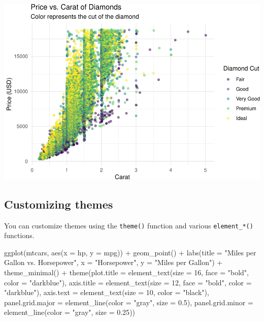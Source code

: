 \documentclass[
]{book}
\newenvironment{Shaded}{\begin{snugshade}}{\end{snugshade}}
\newcommand{\AttributeTok}[1]{\textcolor[rgb]{0.77,0.63,0.00}{#1}}
\newcommand{\DecValTok}[1]{\textcolor[rgb]{0.00,0.00,0.81}{#1}}
\newcommand{\FloatTok}[1]{\textcolor[rgb]{0.00,0.00,0.81}{#1}}
\newcommand{\FunctionTok}[1]{\textcolor[rgb]{0.00,0.00,0.00}{#1}}
\newcommand{\NormalTok}[1]{#1}
\newcommand{\SpecialCharTok}[1]{\textcolor[rgb]{0.00,0.00,0.00}{#1}}
\newcommand{\StringTok}[1]{\textcolor[rgb]{0.31,0.60,0.02}{#1}}
\begin{document}
\includegraphics[width=1\linewidth]{graphformatting_files/figure-latex/unnamed-chunk-3-1}

\hypertarget{customizing-themes}{%
\subsection{Customizing themes}\label{customizing-themes}}

You can customize themes using the \texttt{theme()} function and various \texttt{element\_*()} functions.

\begin{Shaded}
\begin{Highlighting}[]
\FunctionTok{ggplot}\NormalTok{(mtcars, }\FunctionTok{aes}\NormalTok{(}\AttributeTok{x =}\NormalTok{ hp, }\AttributeTok{y =}\NormalTok{ mpg)) }\SpecialCharTok{+}
  \FunctionTok{geom\_point}\NormalTok{() }\SpecialCharTok{+}
  \FunctionTok{labs}\NormalTok{(}\AttributeTok{title =} \StringTok{"Miles per Gallon vs. Horsepower"}\NormalTok{,}
       \AttributeTok{x =} \StringTok{"Horsepower"}\NormalTok{,}
       \AttributeTok{y =} \StringTok{"Miles per Gallon"}\NormalTok{) }\SpecialCharTok{+}
  \FunctionTok{theme\_minimal}\NormalTok{() }\SpecialCharTok{+}
  \FunctionTok{theme}\NormalTok{(}\AttributeTok{plot.title =} \FunctionTok{element\_text}\NormalTok{(}\AttributeTok{size =} \DecValTok{16}\NormalTok{, }\AttributeTok{face =} \StringTok{"bold"}\NormalTok{, }\AttributeTok{color =} \StringTok{"darkblue"}\NormalTok{),}
        \AttributeTok{axis.title =} \FunctionTok{element\_text}\NormalTok{(}\AttributeTok{size =} \DecValTok{12}\NormalTok{, }\AttributeTok{face =} \StringTok{"bold"}\NormalTok{, }\AttributeTok{color =} \StringTok{"darkblue"}\NormalTok{),}
        \AttributeTok{axis.text =} \FunctionTok{element\_text}\NormalTok{(}\AttributeTok{size =} \DecValTok{10}\NormalTok{, }\AttributeTok{color =} \StringTok{"black"}\NormalTok{),}
        \AttributeTok{panel.grid.major =} \FunctionTok{element\_line}\NormalTok{(}\AttributeTok{color =} \StringTok{"gray"}\NormalTok{, }\AttributeTok{size =} \FloatTok{0.5}\NormalTok{),}
        \AttributeTok{panel.grid.minor =} \FunctionTok{element\_line}\NormalTok{(}\AttributeTok{color =} \StringTok{"gray"}\NormalTok{, }\AttributeTok{size =} \FloatTok{0.25}\NormalTok{))}
\end{Highlighting}
\end{Shaded}
\end{document}
